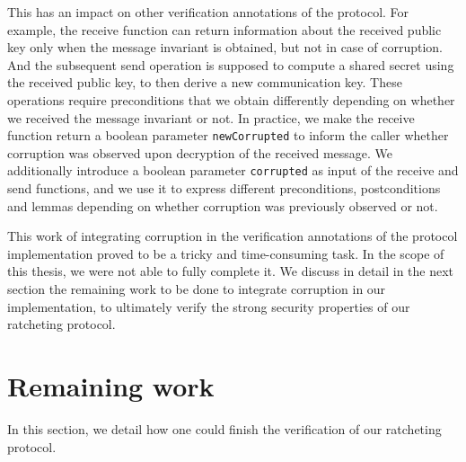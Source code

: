 This has an impact on other verification annotations of the protocol.
For example, the receive function can return information about the received public key only when the message invariant is obtained, but not in case of corruption.
And the subsequent send operation is supposed to compute a shared secret using the received public key, to then derive a new communication key.
These operations require preconditions that we obtain differently depending on whether we received the message invariant or not.
In practice, we make the receive function return a boolean parameter \texttt{newCorrupted} to inform the caller whether corruption was observed upon decryption of the received message.
We additionally introduce a boolean parameter \texttt{corrupted} as input of the receive and send functions, and we use it to express different preconditions, postconditions and lemmas depending on whether corruption was previously observed or not.

This work of integrating corruption in the verification annotations of the protocol implementation proved to be a tricky and time-consuming task.
In the scope of this thesis, we were not able to fully complete it.
We discuss in detail in the next section the remaining work to be done to integrate corruption in our implementation, to ultimately verify the strong security properties of our ratcheting protocol.

\section{Remaining work}
\label{sec:remaining-work}

In this section, we detail how one could finish the verification of our ratcheting protocol.

